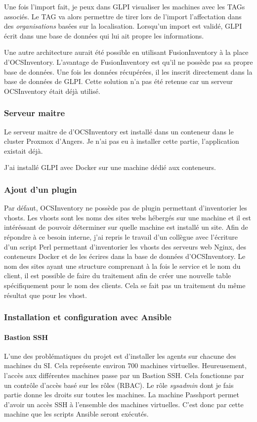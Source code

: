 \documentclass[12pt]{article}
\begin{document}
Une fois l'import fait, je peux dans GLPI visualiser les machines avec les TAGs associés. 
Le TAG va alors permettre de tirer lors de l'import l'affectation dans des \textit{organisations} basées sur la localisation.
Lorsqu'un import est validé, GLPI écrit dans une base de données qui lui ait propre les informations.

Une autre architecture aurait été possible en utilisant FusionInventory à la place d'OCSInventory. 
L'avantage de FusionInventory est qu'il ne possède pas sa propre base de données. 
Une fois les données récupérées, il les inscrit directement dans la base de données de GLPI. 
Cette solution n'a pas été retenue car un serveur OCSInventory était déjà utilisé.

\subsubsection{Serveur maitre}
Le serveur maitre de d'OCSInventory est installé dans un conteneur dans le cluster Proxmox d'Angers.
Je n'ai pas eu à installer cette partie, l'application existait déjà.

J'ai installé GLPI avec Docker sur une machine dédié aux conteneurs.

\subsubsection{Ajout d'un plugin}
Par défaut, OCSInventory ne possède pas de plugin permettant d'inventorier les vhosts. 
Les vhosts sont les noms des sites webs hébergés sur une machine et il est intéréssant de pouvoir déterminer sur quelle machine est installé un site. 
Afin de répondre à ce besoin interne, j'ai repris le travail d'un collègue avec l'écriture d'un script Perl permettant d'inventorier les vhosts des serveurs web Nginx, des conteneurs Docker et de les écrires dans la base de données d'OCSInventory.
Le nom des sites ayant une structure comprenant à la fois le service et le nom du client, il est possible de faire du traitement afin de créer une nouvelle table spécifiquement pour le nom des clients.
Cela se fait pas un traitement du même résultat que pour les vhost.

\subsubsection{Installation et configuration avec Ansible}
\paragraph{Bastion SSH}
L'une des problématiques du projet est d'installer les agents sur chacune des machines du SI. 
Cela représente environ 700 machines virtuelles. 
Heureusement, l'accès aux différentes machines passe par un Bastion SSH. 
Cela fonctionne par un contrôle d'accès basé sur les rôles (RBAC). 
Le rôle \textit{sysadmin} dont je fais partie donne les droits sur toutes les machines. 
La machine Passhport permet d'avoir un accès SSH à l'ensemble des machines virtuelles.
C'est donc par cette machine que les scripts Ansible seront exécutés.
\end{document}
